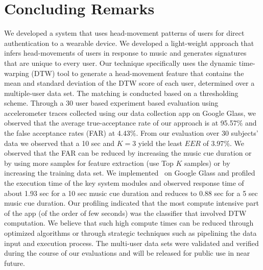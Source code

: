 \section{Concluding Remarks}
\label{sec:conc}

We developed a system that uses head-movement patterns of users for direct
authentication to a wearable device. We developed a light-weight approach that 
infers head-movements of users in response to music and generates signatures
that are unique to every user.
Our technique specifically uses the dynamic time-warping (DTW) tool to 
generate a head-movement feature that contains the mean and standard 
deviation of the DTW score of each user, determined over a multiple-user data 
set. The matching is conducted based on a thresholding scheme.
Through a 30 user based experiment based evaluation using accelerometer traces
collected using our data collection app on Google Glass, we observed that the
average true-acceptance rate of our approach is at 95.57$\%$ and the false
acceptance rates (FAR) at 4.43$\%$. 
From our evaluation over 30 subjects' data we observed that a 10 sec and $K=3$ 
yield the least $EER$ of 3.97$\%$. We observed that the FAR can be reduced by 
increasing the music cue duration or by using more samples for feature 
extraction (use Top $K$ samples) or by increasing the training data set. 
We implemented \systemname~on Google Glass and profiled the execution time of 
the key system modules and observed response time of about 1.93 sec for a 10 
sec music cue duration and reduces to 0.88 sec for a 5 sec music cue duration.
Our profiling indicated that the most compute intensive part of the app (of 
the order of few seconds) was the classifier that involved DTW computation. We 
believe that such high compute times can be reduced through optimized 
algorithms or through strategic techniques such as pipelining the data input 
and execution process. 
The multi-user data sets were validated and verified during the
course of our evaluations and will be released for public use in near future.

